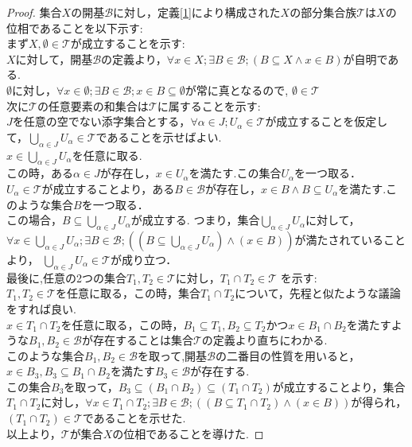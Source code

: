 \documentclass[dvipdfmx]{jbook}
\theoremstyle{remark}
\theoremstyle{plain}
\begin{document}
\begin{proof}
	集合$X$の開基$\mathcal{B}$に対し，定義\ref{1}により構成された$X$の部分集合族$\mathcal{T}$は$X$の位相であることを以下示す:\\
	まず$X, \emptyset \in \mathcal{T} $が成立することを示す:\\
	$ X$に対して，開基$\mathcal{B}$の定義より，$\forall x \in X  ; \exists B \in \mathcal{B} ; \left( B  \subseteq X \land x \in B \right)$が自明である.\\
	$\emptyset $に対し，$\forall x \in \emptyset ; \exists B \in \mathcal{B} ; x \in B \subseteq \emptyset$が常に真となるので, $\emptyset \in \mathcal{T}$\\
	次に$\mathcal{T}$の任意要素の和集合は$\mathcal{T}$に属することを示す:\\
	$J$を任意の空でない添字集合とする，$\forall \alpha \in J; U_{\alpha} \in \mathcal{T}$が成立することを仮定して，$\bigcup\limits_{\alpha \in J} U_{\alpha } \in \mathcal{T}$であることを示せばよい.\\
	$x \in \bigcup\limits_{\alpha \in J} U_{\alpha }$を任意に取る.\\
	この時，ある$\alpha \in J$が存在し，$x \in U_{\alpha}$を満たす.この集合$U_{\alpha}$を一つ取る．\\
	$U_{\alpha } \in \mathcal{T}$が成立することより，ある$B \in \mathcal{B}$が存在し，$x \in B \land B \subseteq U_{\alpha}$を満たす.このような集合$B$を一つ取る．\\
	この場合，$B \subseteq \bigcup\limits_{\alpha \in J} U_{\alpha } $が成立する.
	つまり，集合$\bigcup\limits_{\alpha \in J} U_{\alpha } $に対して，$\forall x \in \bigcup\limits_{\alpha \in J} U_{\alpha } ; \exists B \in \mathcal{B} ; \left( \left( B  \subseteq \bigcup\limits_{\alpha \in J} U_{\alpha } \right)  \land \left( x \in B \right) \right) $が満たされていることより，
	$\bigcup\limits_{\alpha \in J} U_{\alpha } \in \mathcal{T}$が成り立つ．\\
	最後に,任意の2つの集合$T_1 , T_2 \in \mathcal{T}$に対し，$T_1 \cap T_2 \in \mathcal{T}$ を示す:\\
	$T_1 , T_2 \in \mathcal{T}$を任意に取る，この時，集合$T_1 \cap T_2$について，先程と似たような議論をすれば良い.\\
	$x \in T_1 \cap T_2 $を任意に取る，この時，$B_1 \subseteq T_1, B_2 \subseteq T_2$かつ$x \in B_1 \cap B_2$を満たすような$B_1,B_2 \in \mathcal{B}$が存在することは集合$\mathcal{T}$の定義より直ちにわかる.\\
	このような集合$B_1, B_2 \in \mathcal{B}$を取って,開基$\mathcal{B}$の二番目の性質を用いると，$x \in B_3 ,B_3 \subseteq B_1 \cap B_2 $を満たす$B_3 \in \mathcal{B}$が存在する.\\
	この集合$B_3$を取って，$B_3 \subseteq \left( B_1 \cap B_2  \right) \subseteq \left( T_1 \cap T_2 \right) $が成立することより，集合$T_1 \cap T_2 $に対し，$\forall x \in T_1 \cap T_2 ; \exists B \in \mathcal{B} ; \left( \left( B  \subseteq T_1  \cap T_2 \right) \land \left( x \in B \right) \right) $が得られ，$\left( T_1 \cap T_2 \right) \in \mathcal{T}$であることを示せた.\\
	以上より，$\mathcal{T}$が集合$X$の位相であることを導けた.
\end{proof}
\end{document}
